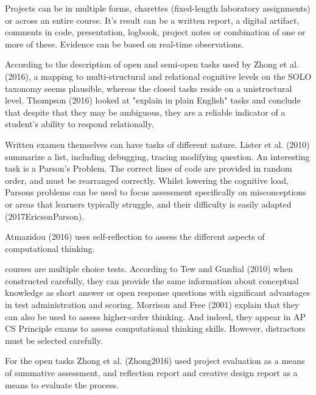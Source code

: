 Projects can be in multiple forms, charettes (fixed-length laboratory assignments) or across an entire course. It's result can be a written report, a digital artifact, comments in code, presentation, logbook, project notes or combination of one or more of these. Evidence can be based on real-time observations.

According to the description of open and semi-open tasks used by Zhong et al. (2016), a mapping to multi-structural and relational cognitive levels on the SOLO taxonomy seems plausible, whereas the closed tasks reside on a unistructural level. Thompson (2016) looked at "explain in plain English" tasks and conclude that despite that they may be ambiguous, they are a reliable indicator of a student’s ability to respond relationally.


Written examen themselves can have tasks of different nature. Lister et al. (2010) summarize a list, including debugging, tracing modifying question. An interesting task is a Parson's Problem. The correct lines of code are provided in random order, and must be rearranged correctly. Whilst lowering the cognitive load, Parsons problems can be used to focus assessment specifically on misconceptions or areas that learners typically struggle, and their difficulty is easily adapted (2017EricsonParson).

Atmazidou (2016) uses self-reflection to assess the different aspects of computational thinking.

courses are multiple choice tests. According to Tew and Guzdial (2010) when constructed carefully, they can provide the same information about conceptual knowledge as short answer or open response questions with significant advantages in test administration and scoring. Morrison and Free (2001) explain that they can also be used to assess higher-order thinking. And indeed, they appear in AP CS Principle exams to assess computational thinking skills. However, distractors must be selected carefully.


For the open tasks Zhong et al. (Zhong2016) used project evaluation as a means of summative assessment, and reflection report and creative design report as a means to evaluate the process.




